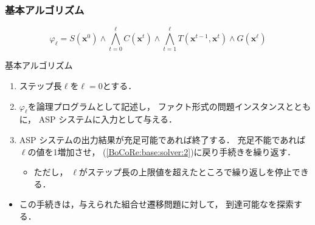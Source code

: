 \documentclass[dvipdfmx,11pt]{beamer}
\begin{document}
\begin{frame}
  \frametitle{基本アルゴリズム}

  \[
    \varphi_{\ell} = S(\bm{x}^0)  
    \land \bigwedge_{t=0}^{\ell} C(\bm{x}^t) 
    \land \bigwedge_{t=1}^{\ell} T(\bm{x}^{t-1},\bm{x}^{t}) 
    \land G(\bm{x}^\ell)  
  \]

\begin{block}{基本アルゴリズム}
\begin{enumerate}
\item ステップ長$\ell$を$\ell=0$とする．
\item \label{BoCoRe:base:solver:2}
  $\varphi_\ell$を論理プログラムとして記述し，
  ファクト形式の問題インスタンスとともに，
  ASP システムに入力として与える．
\item ASP システムの出力結果が充足可能であれば終了する．
  充足不能であれば$\ell$の値を1増加させ，
  (\ref{BoCoRe:base:solver:2})に戻り手続きを繰り返す．
  \begin{itemize}
    \item ただし，
      $\ell$がステップ長の上限値を超えたところで繰り返しを停止できる．
  \end{itemize}
\end{enumerate}
\end{block}

\begin{itemize}
\item この手続きは，与えられた組合せ遷移問題に対して，
  到達可能なを探索する．
\end{itemize}
\end{frame}
\end{document}
